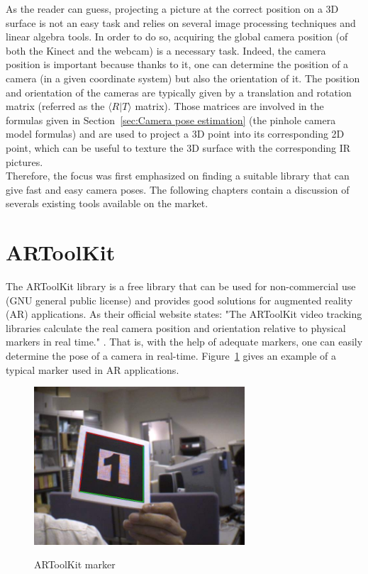 As the reader can guess, projecting a picture at the correct position on a 3D surface is not an easy task and relies on several image processing techniques and linear algebra tools. In order to do so, acquiring the global camera position (of both the Kinect and the webcam) is a necessary task. Indeed, the camera position is important because thanks to it, one can determine the position of a camera (in a given coordinate system) but also the orientation of it. The position and orientation of the cameras are typically given by a translation and rotation matrix (referred as the $\langle R\vert T\rangle$ matrix). Those matrices are involved in the formulas given in Section~\ref{sec:Camera pose estimation} (the pinhole camera model formulas) and are used to project a 3D point into its corresponding 2D point, which can be useful to texture the 3D surface with the corresponding IR pictures.\\

Therefore, the focus was first emphasized on finding a suitable library that can give fast and easy camera poses. The following chapters contain a discussion of severals existing tools available on the market.


\section{ARToolKit}
\label{sec:ARToolKit}
The ARToolKit library is a free library that can be used for non-commercial use (GNU general public license) and provides good solutions for augmented reality (AR) applications. As their official website states: "The ARToolKit video tracking libraries calculate the real camera position and orientation relative to physical markers in real time." \cite{artoolkit}. That is, with the help of adequate markers, one can easily determine the pose of a camera in real-time. Figure~\ref{fig:marker} \cite{artoolkit} gives an example of a typical marker used in AR applications.\\


\begin{figure}
\caption{ARToolKit marker}
\centering
    \includegraphics[width=0.7\textwidth]{images/marker.jpg}
\label{fig:marker}
\end{figure}


